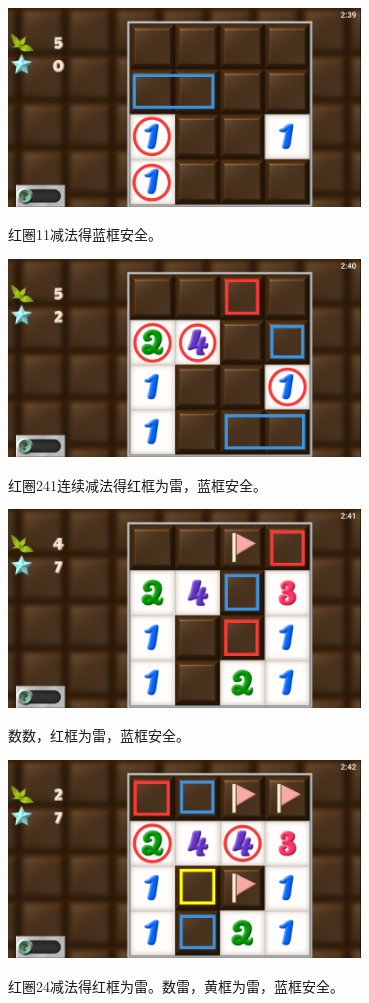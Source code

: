 \subsection{} %
\begin{center}
    \includegraphics[width=0.7\textwidth]{puzzle/32-1.png}
\end{center}
红圈11减法得蓝框安全。
\begin{center}
    \includegraphics[width=0.7\textwidth]{puzzle/32-2.png}
\end{center}
红圈241连续减法得红框为雷，蓝框安全。
\begin{center}
    \includegraphics[width=0.7\textwidth]{puzzle/32-3.png}
\end{center}
数数，红框为雷，蓝框安全。
\begin{center}
    \includegraphics[width=0.7\textwidth]{puzzle/32-4.png}
\end{center}
红圈24减法得红框为雷。数雷，黄框为雷，蓝框安全。


